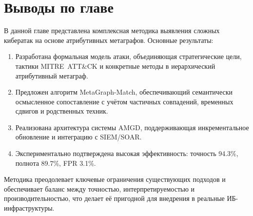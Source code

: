 \section{Выводы по главе}\label{sec:ch3/conclusion}

В данной главе представлена комплексная методика выявления сложных кибератак на основе атрибутивных метаграфов. Основные результаты:
\begin{enumerate}
    \item Разработана формальная модель атаки, объединяющая стратегические цели, тактики MITRE~ATT\&CK и конкретные методы в иерархический атрибутивный метаграф.
    \item Предложен алгоритм MetaGraph-Match, обеспечивающий семантически осмысленное сопоставление с учётом частичных совпадений, временных сдвигов и родственных техник.
    \item Реализована архитектура системы AMGD, поддерживающая инкрементальное обновление и интеграцию с SIEM/SOAR.
    \item Экспериментально подтверждена высокая эффективность: точность 94.3\%, полнота 89.7\%, FPR 3.1\%.
\end{enumerate}

Методика преодолевает ключевые ограничения существующих подходов и обеспечивает баланс между точностью, интерпретируемостью и производительностью, что делает её пригодной для внедрения в реальные ИБ-инфраструктуры.

